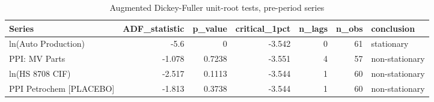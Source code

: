 \begin{table}
\caption{Augmented Dickey-Fuller unit-root tests, pre-period series}
\label{tab:tableS2_unit_root_tests}
\begin{tabular}{lrrrrrl}
\toprule
Series & ADF\_statistic & p\_value & critical\_1pct & n\_lags & n\_obs & conclusion \\
\midrule
ln(Auto Production) & -5.6 & 0 & -3.542 & 0 & 61 & stationary \\
PPI: MV Parts & -1.078 & 0.7238 & -3.551 & 4 & 57 & non-stationary \\
ln(HS 8708 CIF) & -2.517 & 0.1113 & -3.544 & 1 & 60 & non-stationary \\
PPI Petrochem [PLACEBO] & -1.813 & 0.3738 & -3.544 & 1 & 60 & non-stationary \\
\bottomrule
\end{tabular}
\end{table}
